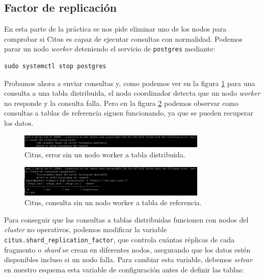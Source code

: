 \subsection*{Factor de replicación}

En esta parte de la práctica se nos pide eliminar uno de los nodos para comprobar si Citus es capaz de ejecutar consultas con normalidad. Podemos parar un nodo \textit{worker} deteniendo el servicio de \texttt{postgres} mediante:

\begin{verbatim}
sudo systemctl stop postgres 
\end{verbatim}

Probamos ahora a enviar consultas y, como podemos ver en la figura \ref{fig:citus_worker_down} para una consulta a una tabla distribuida, el nodo coordinador detecta que un nodo \textit{worker} no responde y la consulta falla. Pero en la figura \ref{fig:citus_worker_down_but_reference} podemos observar como consultas a tablas de referencia siguen funcionando, ya que se pueden recuperar los datos.

\begin{figure}[H]
\centering
\includegraphics[width=0.8\textwidth]{fotos/citus/one_down_error.png}
\caption{Citus, error sin un nodo worker a tabla distribuida.}
\label{fig:citus_worker_down}
\end{figure}

\begin{figure}[H]
\centering
\includegraphics[width=0.8\textwidth]{fotos/citus/one_down_error_but_no.png}
\caption{Citus, consulta sin un nodo worker a tabla de referencia.}
\label{fig:citus_worker_down_but_reference}
\end{figure}

Para conseguir que las consultas a tablas distribuidas funcionen con nodos del \textit{cluster} no operativos, podemos modificar la variable \texttt{citus.shard\_replication\_factor}, que controla cuántas réplicas de cada fragmento o \textit{shard} se crean en diferentes nodos, asegurando que los datos estén disponibles incluso si un nodo falla. Para cambiar esta variable, debemos \textit{setear} en nuestro esquema esta variable de configuración antes de definir las tablas:

